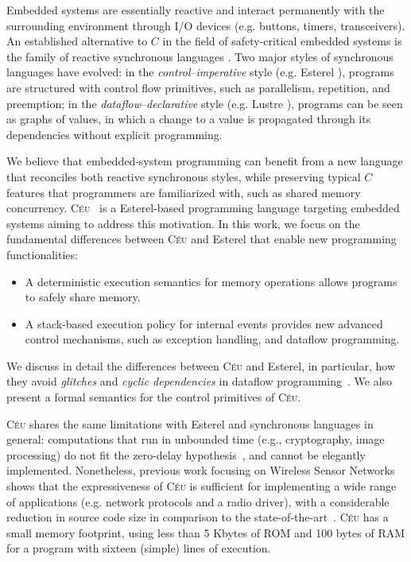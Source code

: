 \documentclass{acm_proc_article-sp}
\newcommand{\CEU}{\textsc{C\'{e}u}\xspace}
\newcommand{\1}{\;}
\newcommand{\2}{\;\;}
\newcommand{\3}{\;\;\;}
\newcommand{\5}{\;\;\;\;\;}
\begin{document}
Embedded systems are essentially reactive and interact permanently with the 
surrounding environment through I/O devices (e.g. buttons, timers, 
transceivers).
%
An established alternative to $C$ in the field of safety-critical embedded 
systems is the family of reactive synchronous languages \cite{rp.twelve}.
Two major styles of synchronous languages have evolved:
in the \emph{control}--\emph{imperative} style (e.g. Esterel 
\cite{esterel.ieee91}), programs are structured with control flow primitives, 
such as parallelism, repetition, and preemption;
in the \emph{dataflow}--\emph{declarative} style (e.g. Lustre 
\cite{lustre.ieee91}), programs can be seen as graphs of values, in which a 
change to a value is propagated through its dependencies without explicit 
programming.

We believe that embedded-system programming can benefit from a new language 
that reconciles both reactive synchronous styles, while preserving typical $C$ 
features that programmers are familiarized with, such as shared memory 
concurrency.
%
\CEU~\cite{ceu.sensys}
is a Esterel-based programming language targeting embedded systems aiming to 
address this motivation.
In this work, we focus on the fundamental differences between \CEU and Esterel 
that enable new programming functionalities:
%
\begin{itemize}
\item A deterministic execution semantics for memory operations allows programs 
to safely share memory.
%
\item A stack-based execution policy for internal events provides new advanced 
control mechanisms, such as exception handling, and dataflow programming.
\end{itemize}

We discuss in detail the differences between \CEU and Esterel, in particular, 
how they avoid \emph{glitches} and \emph{cyclic dependencies} in dataflow 
programming~\cite{frp.survey}.
We also present a formal semantics for the control primitives of \CEU.

\CEU shares the same limitations with Esterel and synchronous languages in 
general:
computations that run in unbounded time (e.g., cryptography, image processing) 
do not fit the zero-delay hypothesis~\cite{rp.hypothesis}, and cannot be 
elegantly implemented.
%
Nonetheless, previous work focusing on Wireless Sensor 
Networks~\cite{ceu.sensys} shows that the expressiveness of \CEU is sufficient 
for implementing a wide range of applications (e.g. network protocols and a 
radio driver), with a considerable reduction in source code size in comparison 
to the state-of-the-art~\cite{wsn.nesc}.
%
\CEU has a small memory footprint, using less than 5 Kbytes of ROM and 100 
bytes of RAM for a program with sixteen (simple) lines of execution.
\end{document}
